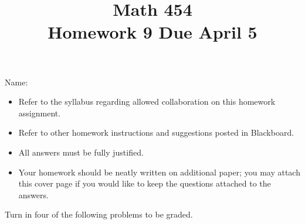 \documentclass[11pt]{amsart}%
\begin{document}
\title{Math 454\\ Homework 9 %
\qquad Due April 5%
}
\author{}
\date{}
\maketitle
\thispagestyle{empty}

\noindent Name:~\hrulefill~~\\

\begin{itemize}
\item Refer to the syllabus regarding allowed collaboration on this homework assignment.
\item Refer to other homework instructions and suggestions posted in Blackboard.
\item All answers must be fully justified.
\item Your homework should be neatly written on additional paper; you may attach this cover page if you would like to keep the questions attached to the answers.
\end{itemize}

\bigskip
Turn in four of the following problems to be graded.
\bigskip
\end{document}
